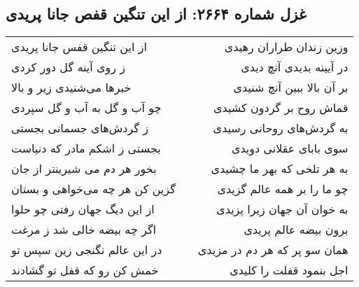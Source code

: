 \begin{center}
\section*{غزل شماره ۲۶۶۴: از این تنگین قفص جانا پریدی}
\label{sec:2664}
\begin{longtable}{l p{0.5cm} r}
از این تنگین قفس جانا پریدی
&&
وزین زندان طراران رهیدی
\\
ز روی آینه گل دور کردی
&&
در آیینه بدیدی آنچ دیدی
\\
خبرها می‌شنیدی زیر و بالا
&&
بر آن بالا ببین آنچ شنیدی
\\
چو آب و گل به آب و گل سپردی
&&
قماش روح بر گردون کشیدی
\\
ز گردش‌های جسمانی بجستی
&&
به گردش‌های روحانی رسیدی
\\
بجستی ز اشکم مادر که دنیاست
&&
سوی بابای عقلانی دویدی
\\
بخور هر دم می شیرینتر از جان
&&
به هر تلخی که بهر ما چشیدی
\\
گزین کن هر چه می‌خواهی و بستان
&&
چو ما را بر همه عالم گزیدی
\\
از این دیگ جهان رفتی چو حلوا
&&
به خوان آن جهان زیرا پزیدی
\\
اگر چه بیضه خالی شد ز مرغت
&&
برون بیضه عالم پریدی
\\
در این عالم نگنجی زین سپس تو
&&
همان سو پر که هر دم در مزیدی
\\
خمش کن رو که قفل تو گشادند
&&
اجل بنمود قفلت را کلیدی
\\
\end{longtable}
\end{center}
